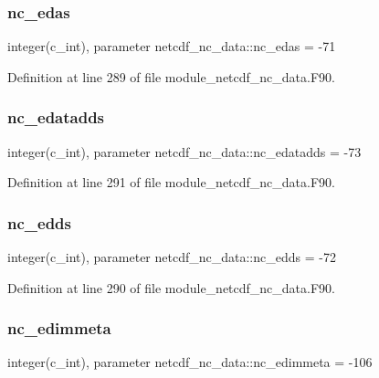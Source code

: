 \subsubsection{\texorpdfstring{nc\+\_\+edas}{nc\_edas}}
{\footnotesize\ttfamily integer(c\+\_\+int), parameter netcdf\+\_\+nc\+\_\+data\+::nc\+\_\+edas = -\/71}



Definition at line 289 of file module\+\_\+netcdf\+\_\+nc\+\_\+data.\+F90.

\mbox{\label{namespacenetcdf__nc__data_ae8a1b8ebc79e1affd93b1ab2c1e837e5}} 
\subsubsection{\texorpdfstring{nc\+\_\+edatadds}{nc\_edatadds}}
{\footnotesize\ttfamily integer(c\+\_\+int), parameter netcdf\+\_\+nc\+\_\+data\+::nc\+\_\+edatadds = -\/73}



Definition at line 291 of file module\+\_\+netcdf\+\_\+nc\+\_\+data.\+F90.

\mbox{\label{namespacenetcdf__nc__data_a6cfc318dec516ce1e69d192810250b9b}} 
\subsubsection{\texorpdfstring{nc\+\_\+edds}{nc\_edds}}
{\footnotesize\ttfamily integer(c\+\_\+int), parameter netcdf\+\_\+nc\+\_\+data\+::nc\+\_\+edds = -\/72}



Definition at line 290 of file module\+\_\+netcdf\+\_\+nc\+\_\+data.\+F90.

\mbox{\label{namespacenetcdf__nc__data_add520bc3a4ddd4262455c5ea1bf98f1e}} 
\subsubsection{\texorpdfstring{nc\+\_\+edimmeta}{nc\_edimmeta}}
{\footnotesize\ttfamily integer(c\+\_\+int), parameter netcdf\+\_\+nc\+\_\+data\+::nc\+\_\+edimmeta = -\/106}



